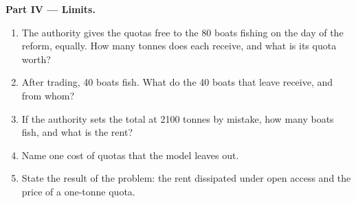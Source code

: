 \begin{problem}
\medskip
\noindent\textbf{Part IV --- Limits.}
\begin{enumerate}[resume]
\item The authority gives the quotas free to the 80 boats fishing on the day of the reform, equally. How many tonnes does each receive, and what is its quota worth?
\item After trading, 40 boats fish. What do the 40 boats that leave receive, and from whom?
\item If the authority sets the total at 2100 tonnes by mistake, how many boats fish, and what is the rent?
\item Name one cost of quotas that the model leaves out.
\item State the result of the problem: the rent dissipated under open access and the price of a one-tonne quota.
\end{enumerate}
\end{problem}
